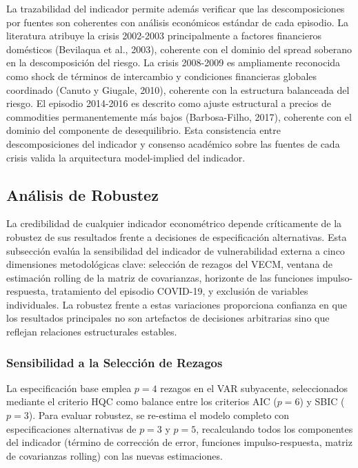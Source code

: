 \documentclass[3p,11pt,draft,natbib=false]{elsarticle}
\begin{document}
La trazabilidad del indicador permite además verificar que las descomposiciones por fuentes son coherentes con análisis económicos estándar de cada episodio. La literatura atribuye la crisis 2002-2003 principalmente a factores financieros domésticos (Bevilaqua et al., 2003), coherente con el dominio del spread soberano en la descomposición del riesgo. La crisis 2008-2009 es ampliamente reconocida como shock de términos de intercambio y condiciones financieras globales coordinado (Canuto y Giugale, 2010), coherente con la estructura balanceada del riesgo. El episodio 2014-2016 es descrito como ajuste estructural a precios de commodities permanentemente más bajos (Barbosa-Filho, 2017), coherente con el dominio del componente de desequilibrio. Esta consistencia entre descomposiciones del indicador y consenso académico sobre las fuentes de cada crisis valida la arquitectura model-implied del indicador.

\subsection{Análisis de Robustez}
\label{sec:robustez}

La credibilidad de cualquier indicador econométrico depende críticamente de la robustez de sus resultados frente a decisiones de especificación alternativas. Esta subsección evalúa la sensibilidad del indicador de vulnerabilidad externa a cinco dimensiones metodológicas clave: selección de rezagos del VECM, ventana de estimación rolling de la matriz de covarianzas, horizonte de las funciones impulso-respuesta, tratamiento del episodio COVID-19, y exclusión de variables individuales. La robustez frente a estas variaciones proporciona confianza en que los resultados principales no son artefactos de decisiones arbitrarias sino que reflejan relaciones estructurales estables.

\subsubsection{Sensibilidad a la Selección de Rezagos}

La especificación base emplea $p=4$ rezagos en el VAR subyacente, seleccionados mediante el criterio HQC como balance entre los criterios AIC ($p=6$) y SBIC ($p=3$). Para evaluar robustez, se re-estima el modelo completo con especificaciones alternativas de $p=3$ y $p=5$, recalculando todos los componentes del indicador (término de corrección de error, funciones impulso-respuesta, matriz de covarianzas rolling) con las nuevas estimaciones.
\end{document}
